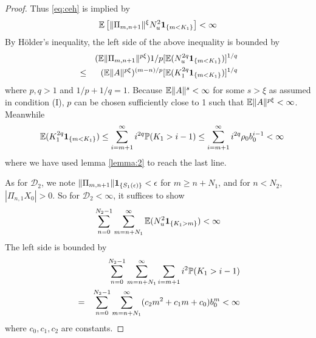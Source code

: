 \begin{proof}
  Thus \eqref{eq:ceh} is implied by
  \[
    \E \left[
        \|\Pi_{m, n+1}\|^{\xi}
      N_u^2
      \1{m < K_1}
      \right] < \infty
  \]
By H\"older's inequality, the left side of the above inequality is
bounded by
\begin{eqnarray*}
  &&
  (\E \|\Pi_{m, n+1}\|^{p \xi}){1/p}
  [\E (N_u^{2q} \1{m < K_1})]^{1/q} \\
  &\leq&
  (\E \|A\|^{p \xi})^{(m-n)/p}
  [\E (K_1^{2q} \1{m < K_1})]^{1/q}
\end{eqnarray*}
where $p,q>1$ and $1/p + 1/q = 1$.
Because $\E \|A\|^{s} < \infty$ for some $s > \xi$ as assumed in
condition (I), $p$ can be chosen sufficiently close to 1 such that
$\E \|A\|^{p \xi} < \infty$. Meanwhile
\begin{eqnarray*}
  &&
  \E (K_1^{2q} \1{m < K_1}) 
  \leq
  \sum_{i=m+1}^\infty i^{2q} \P(K_1 > i - 1)
  \leq
  \sum_{i=m+1}^\infty i^{2q} \rho_0 b_0^{i-1} < \infty
\end{eqnarray*}
where we have used lemma \ref{lemma:2} to reach the
last line.

As for $\mathscr D_2$, we note
$\|\Pi_{m, n+1}\|\1{S_1(\epsilon)} < \epsilon$
for $m \geq n + N_1$, and for $n < N_2$,
$|\Pi_{n, 1} X_0| > 0$. So for $\mathscr D_2 < \infty$, it suffices to
show
\[
\sum_{n=0}^{N_2 - 1} \sum_{m=n+N_1}^\infty
\E (N_u^2 \1{K_1 > m}) < \infty
\]
The left side is bounded by
\begin{eqnarray*}
  &&
  \sum_{n=0}^{N_2 - 1} \sum_{m=n+N_1}^\infty \sum_{i=m+1}
  i^2 \P(K_1 > i - 1) \\
  &=&
  \sum_{n=0}^{N_2 - 1} \sum_{m=n+N_1}^\infty
  (c_2 m^2 + c_1 m + c_0)b_0^m < \infty
\end{eqnarray*}
where $c_0, c_1, c_2$ are constants.


\end{proof}
